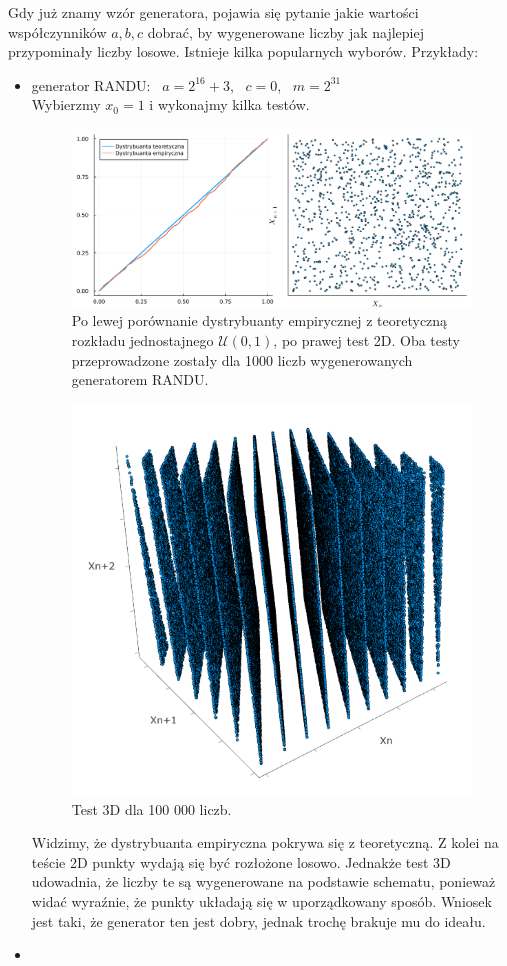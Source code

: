 \documentclass[12pt]{mwrep}
\begin{document}
	\noindent Gdy już znamy wzór generatora, pojawia się pytanie jakie wartości współczynników $a, b, c$ dobrać, by wygenerowane liczby jak najlepiej przypominały liczby losowe. Istnieje kilka popularnych wyborów. Przykłady:
	\begin{itemize}[leftmargin=10mm]
		\item generator RANDU: \ $a = 2^{16} + 3$, \ $c = 0$, \ $m = 2^{31}$\\
		Wybierzmy $x_0 = 1$ i wykonajmy kilka testów.
		\begin{figure}[H]
			\centering
			\caption{Po lewej porównanie dystrybuanty empirycznej z teoretyczną rozkładu jednostajnego $\mathcal{U}(0, 1)$, po prawej test 2D. Oba testy przeprowadzone zostały dla 1000 liczb wygenerowanych generatorem RANDU.}
			\includegraphics[scale=0.1]{fig/fig_gen1.png}
		\end{figure}
		\begin{figure}[H]
			\centering
			\caption{Test 3D dla 100 000 liczb.}
			\includegraphics[scale=1]{fig/fig_gen2.png}
		\end{figure}
		Widzimy, że dystrybuanta empiryczna pokrywa się z teoretyczną. Z kolei na teście 2D punkty wydają się być rozłożone losowo. Jednakże test 3D udowadnia, że liczby te są wygenerowane na podstawie schematu, ponieważ widać wyraźnie, że punkty układają się w uporządkowany sposób. Wniosek jest taki, że generator ten jest dobry, jednak trochę brakuje mu do ideału.
		\item 
	\end{itemize}
\end{document}
